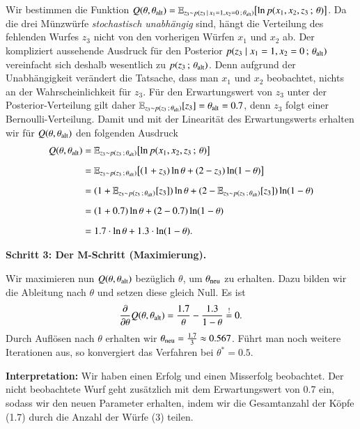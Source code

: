 Wir bestimmen die Funktion $Q(\theta, \theta_{\text{alt}}) = \mathbb{E}_{z_3 \sim p(z_3\,\mid\, x_1 = 1, x_2 = 0 \,;\, \theta_{\text{alt}})}\bigl[ \ln p(x_1, x_2, z_3 \,;\, \theta) \bigr]$. Da die drei Münzwürfe \textit{stochastisch unabhängig} sind, hängt die Verteilung des fehlenden Wurfes $z_3$ nicht von den vorherigen Würfen $x_1$ und $x_2$ ab. Der kompliziert aussehende Ausdruck für den Posterior $p(z_3 \mid x_1 = 1, x_2 = 0 \,;\, \theta_{\text{alt}})$ vereinfacht sich deshalb wesentlich zu $p(z_3 \,;\, \theta_{\text{alt}})$. Denn aufgrund der Unabhängigkeit verändert die Tatsache, dass man $x_1$ und $x_2$ beobachtet, nichts an der Wahrscheinlichkeit für $z_3$. Für den Erwartungswert von $z_3$ unter der Posterior-Verteilung gilt daher $\mathbb{E}_{z_3 \sim p(z_3 \,;\, \theta_{\text{alt}})}[z_3] = \theta_{\text{alt}} = 0.7$, denn $z_3$ folgt einer Bernoulli-Verteilung. Damit und mit der Linearität des Erwartungswerts erhalten wir für $Q(\theta, \theta_{\text{alt}})$ den folgenden Ausdruck
\begin{align*}
	Q(\theta, \theta_{\text{alt}})
		&= \mathbb{E}_{z_3 \sim p(z_3 \,;\, \theta_{\text{alt}})}\bigl[ \ln p(x_1, x_2, z_3 \,;\, \theta) \bigr]
\\[2mm]
		&= \mathbb{E}_{z_3 \sim p(z_3 \,;\, \theta_{\text{alt}})}\bigl[ (1 + z_3) \ln \theta + (2 - z_3) \ln(1 - \theta) \bigr]
\\[2mm]
		&= (1 + \mathbb{E}_{z_3 \sim p(z_3 \,;\, \theta_{\text{alt}})}[z_3]) \ln \theta + (2 - \mathbb{E}_{z_3 \sim p(z_3 \,;\, \theta_{\text{alt}})}[z_3]) \ln(1 - \theta)
\\[2mm]
		&= (1 + 0.7) \ln \theta + (2 - 0.7) \ln(1 - \theta)
\\[2mm]
		&= 1.7 \cdot \ln \theta + 1.3 \cdot \ln(1 - \theta).
\end{align*}

\textbf{Schritt 3: Der M-Schritt (Maximierung).}

Wir maximieren nun $Q(\theta, \theta_{\text{alt}})$ bezüglich $\theta$, um $\theta_{\text{neu}}$ zu erhalten. Dazu bilden wir die Ableitung nach $\theta$ und setzen diese gleich Null. Es ist
\begin{equation*}
	\frac{\partial}{\partial \theta} Q(\theta, \theta_{\text{alt}})
		= \frac{1.7}{\theta} - \frac{1.3}{1 - \theta} \overset{!}{=} 0.
\end{equation*}
Durch Auflösen nach $\theta$ erhalten wir $\theta_{\text{neu}} = \frac{1.7}{3} \approx 0.567$. Führt man noch weitere Iterationen aus, so konvergiert das Verfahren bei $\theta^* = 0.5$.

\textbf{Interpretation:} Wir haben einen Erfolg und einen Misserfolg beobachtet. Der nicht beobachtete Wurf geht zusätzlich mit dem Erwartungswert von 0.7 ein, sodass wir den neuen Parameter erhalten, indem wir die Gesamtanzahl der Köpfe (1.7) durch die Anzahl der Würfe (3) teilen.


\newpage